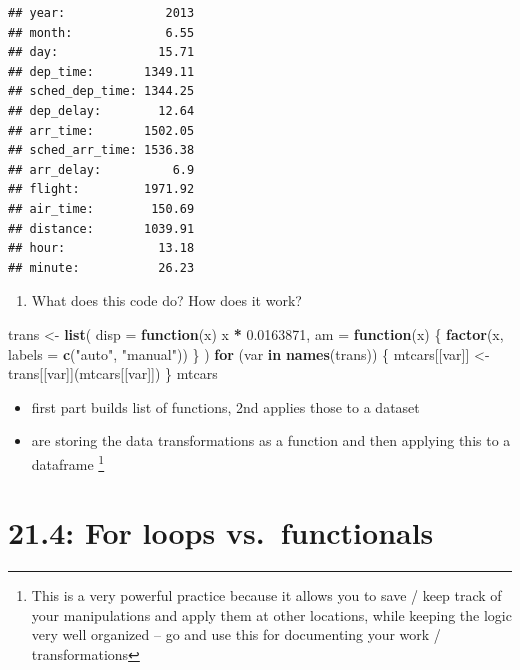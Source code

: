 \documentclass[]{book}
\newenvironment{Shaded}{\begin{snugshade}}{\end{snugshade}}
\newcommand{\ControlFlowTok}[1]{\textcolor[rgb]{0.13,0.29,0.53}{\textbf{#1}}}
\newcommand{\DataTypeTok}[1]{\textcolor[rgb]{0.13,0.29,0.53}{#1}}
\newcommand{\FloatTok}[1]{\textcolor[rgb]{0.00,0.00,0.81}{#1}}
\newcommand{\KeywordTok}[1]{\textcolor[rgb]{0.13,0.29,0.53}{\textbf{#1}}}
\newcommand{\NormalTok}[1]{#1}
\newcommand{\OperatorTok}[1]{\textcolor[rgb]{0.81,0.36,0.00}{\textbf{#1}}}
\newcommand{\StringTok}[1]{\textcolor[rgb]{0.31,0.60,0.02}{#1}}
\providecommand{\tightlist}{%
  \setlength{\itemsep}{0pt}\setlength{\parskip}{0pt}}
\let\rmarkdownfootnote\footnote%
\def\footnote{\protect\rmarkdownfootnote}
\theoremstyle{definition}
\theoremstyle{definition}
\theoremstyle{definition}
\theoremstyle{remark}
\begin{document}
\begin{verbatim}
## year:              2013
## month:             6.55
## day:              15.71
## dep_time:       1349.11
## sched_dep_time: 1344.25
## dep_delay:        12.64
## arr_time:       1502.05
## sched_arr_time: 1536.38
## arr_delay:          6.9
## flight:         1971.92
## air_time:        150.69
## distance:       1039.91
## hour:             13.18
## minute:           26.23
\end{verbatim}

\begin{enumerate}
\def\labelenumi{\arabic{enumi}.}
\setcounter{enumi}{3}
\tightlist
\item
  What does this code do? How does it work?
\end{enumerate}

\begin{Shaded}
\begin{Highlighting}[]
\NormalTok{trans <-}\StringTok{ }\KeywordTok{list}\NormalTok{( }
  \DataTypeTok{disp =} \ControlFlowTok{function}\NormalTok{(x) x }\OperatorTok{*}\StringTok{ }\FloatTok{0.0163871}\NormalTok{,}
  \DataTypeTok{am =} \ControlFlowTok{function}\NormalTok{(x) \{}
    \KeywordTok{factor}\NormalTok{(x, }\DataTypeTok{labels =} \KeywordTok{c}\NormalTok{(}\StringTok{"auto"}\NormalTok{, }\StringTok{"manual"}\NormalTok{))}
\NormalTok{  \}}
\NormalTok{)}
\ControlFlowTok{for}\NormalTok{ (var }\ControlFlowTok{in} \KeywordTok{names}\NormalTok{(trans)) \{}
\NormalTok{  mtcars[[var]] <-}\StringTok{ }\NormalTok{trans[[var]](mtcars[[var]])}
\NormalTok{\}}
\NormalTok{mtcars}
\end{Highlighting}
\end{Shaded}

\begin{itemize}
\tightlist
\item
  first part builds list of functions, 2nd applies those to a dataset
\item
  are storing the data transformations as a function and then applying
  this to a dataframe \footnote{This is a very powerful practice because
    it allows you to save / keep track of your manipulations and apply
    them at other locations, while keeping the logic very well organized
    -- go and use this for documenting your work / transformations}
\end{itemize}

\hypertarget{for-loops-vs.-functionals}{%
\section{21.4: For loops
vs.~functionals}\label{for-loops-vs.-functionals}}
\end{document}
